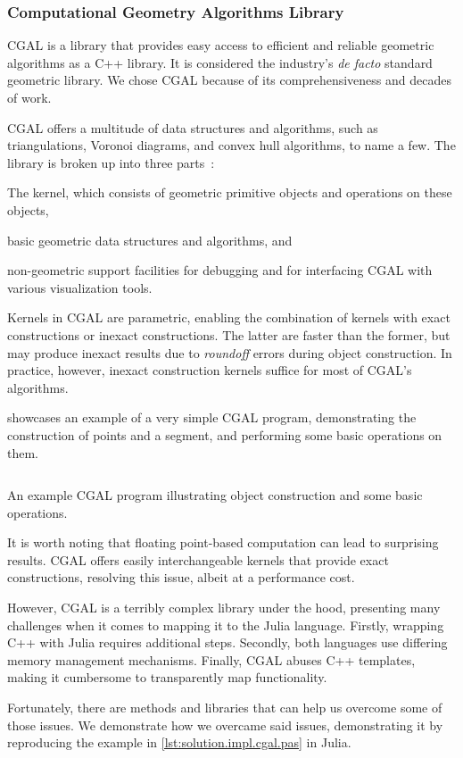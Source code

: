 \subsubsection{Computational Geometry Algorithms Library}%
\label{sec:solution.impl.cgal}

\Ac{CGAL} is a library that provides easy access to efficient and reliable
geometric algorithms as a C++ library.  It is considered the industry's
\textit{de facto} standard geometric library.  We chose \ac{CGAL} because of its
comprehensiveness and decades of work.

\ac{CGAL} offers a multitude of data structures and algorithms, such as
triangulations, Voronoi diagrams, and convex hull algorithms, to name a few.
The library is broken up into three parts~\cite{CGAL:5.3:23LGK}:
\begin{enumerate*}
  \item The kernel, which consists of geometric primitive objects and operations
  on these objects,
  \item basic geometric data structures and algorithms, and
  \item non-geometric support facilities for debugging and for interfacing
  \ac{CGAL} with various visualization tools.
\end{enumerate*}

Kernels in \ac{CGAL} are parametric, enabling the combination of kernels with
exact constructions or inexact constructions.  The latter are faster than the
former, but may produce inexact results due to \textit{roundoff} errors during
object construction.  In practice, however, inexact construction kernels suffice
for most of \ac{CGAL}'s algorithms.

 showcases an example of a very simple
\ac{CGAL} program, demonstrating the construction of points and a segment, and
performing some basic operations on them.

\begin{listing}[htbp]
  \inputminted{cpp}{cpp/points_and_segments.cpp}
  \caption[CGAL: Three points and one segment]{
    An example CGAL program illustrating object construction and some
    basic operations.}\label{lst:solution.impl.cgal.pas}
\end{listing}

It is worth noting that floating point-based computation can lead to surprising
results.  \Ac{CGAL} offers easily interchangeable kernels that provide
exact constructions, resolving this issue, albeit at a performance cost.

However, \ac{CGAL} is a terribly complex library under the hood, presenting many
challenges when it comes to mapping it to the Julia language.  Firstly, wrapping
C++ with Julia requires additional steps.  Secondly, both languages use differing
memory management mechanisms.  Finally, \ac{CGAL} abuses C++ templates, making
it cumbersome to transparently map functionality.

Fortunately, there are methods and libraries that can help us overcome some of
those issues.  We demonstrate how we overcame said issues, demonstrating it by
reproducing the example in \cref{lst:solution.impl.cgal.pas} in Julia.

